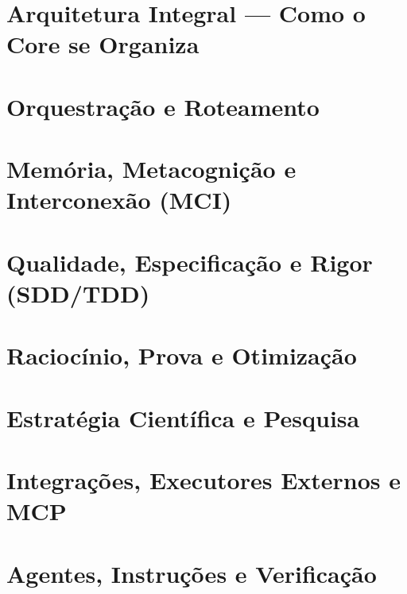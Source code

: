 \documentclass[11pt,a4paper,oneside,openany]{book}
\begin{document}
\pagecolor{ink}
\color{textmain}

\frontmatter









\mainmatter

\part{Arquitetura Integral — Como o Core se Organiza}


\part{Orquestração e Roteamento}


\part{Memória, Metacognição e Interconexão (MCI)}


\part{Qualidade, Especificação e Rigor (SDD/TDD)}


\part{Raciocínio, Prova e Otimização}


\part{Estratégia Científica e Pesquisa}


\part{Integrações, Executores Externos e MCP}


\part{Agentes, Instruções e Verificação}

\end{document}

